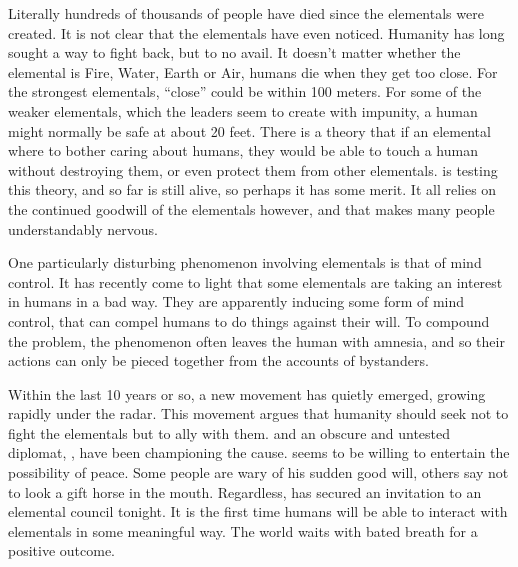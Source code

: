 \documentclass[blue]{elementals}
\begin{document}
Literally hundreds of thousands of people have died since the elementals were created. It is not clear that the elementals have even noticed. Humanity has long sought a way to fight back, but to no avail. It doesn't matter whether the elemental is Fire, Water, Earth or Air, humans die when they get too close. For the strongest elementals, ``close'' could be within 100 meters. For some of the weaker elementals, which the leaders seem to create with impunity, a human might normally be safe at about 20 feet. There is a theory that if an elemental where to bother caring about humans, they would be able to touch a human without destroying them, or even protect them from other elementals. \cDiplomat{} is testing this theory, and so far is still alive, so perhaps it has some merit. It all relies on the continued goodwill of the elementals however, and that makes many people understandably nervous.

One particularly disturbing phenomenon involving elementals is that of mind control. It has recently come to light that some elementals are taking an interest in humans in a bad way. They are apparently inducing some form of mind control, that can compel humans to do things against their will. To compound the problem, the phenomenon often leaves the human with amnesia, and so their actions can only be pieced together from the accounts of bystanders.

Within the last 10 years or so, a new movement has quietly emerged, growing rapidly under the radar. This movement argues that humanity should seek not to fight the elementals but to ally with them. \cLeader{} and an obscure and untested diplomat, \cAvatar{}, have been championing the cause. \cAirKing{} seems to be willing to entertain the possibility of peace. Some people are wary of his sudden good will, others say not to look a gift horse in the mouth. Regardless, \cLeader{} has secured an invitation to an elemental council tonight. It is the first time humans will be able to interact with elementals in some meaningful way. The world waits with bated breath for a positive outcome.

\end{document}
